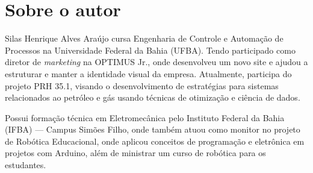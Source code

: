 \section{Sobre o autor}

Silas Henrique Alves Araújo cursa Engenharia de Controle e Automação de Processos na Universidade Federal da Bahia (UFBA). Tendo participado como diretor de \textit{marketing} na OPTIMUS Jr., onde desenvolveu um novo site e ajudou a estruturar e manter a identidade visual da empresa. Atualmente, participa do projeto PRH 35.1, visando o desenvolvimento de estratégias para sistemas relacionados ao petróleo e gás usando técnicas de otimização e ciência de dados.

Possui formação técnica em Eletromecânica pelo Instituto Federal da Bahia (IFBA) — Campus Simões Filho, onde também atuou como monitor no projeto de Robótica Educacional, onde aplicou conceitos de programação e eletrônica em projetos com Arduino, além de ministrar um curso de robótica para os estudantes.
